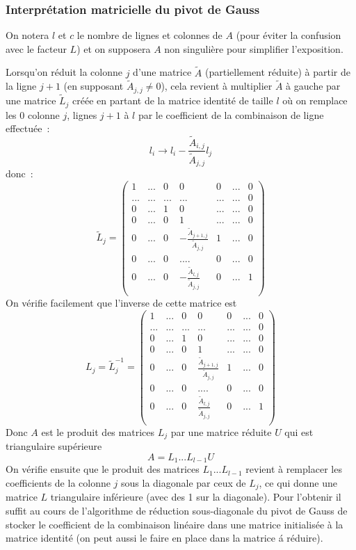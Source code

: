 \documentclass[a4paper,11pt]{article}
\begin{document}
\begin{giacjshere}
\subsubsection{Interpr\'etation matricielle du pivot de Gauss}
On notera $l$ et $c$ le nombre de lignes et colonnes de $A$ (pour
\'eviter la confusion avec le facteur $L$) et on
supposera $A$ non singuli\`ere pour simplifier l'exposition.

 Lorsqu'on r\'eduit la colonne $j$ d'une matrice $\tilde{A}$
 (partiellement r\'eduite) \`a partir
de la ligne $j+1$ (en supposant $\tilde{A}_{j,j} \neq 0$), cela revient \`a
multiplier $\tilde{A}$ \`a gauche par une matrice $\tilde{L}_j$ cr\'e\'ee en
partant de la matrice
identit\'e de taille $l$ o\`u on remplace les 0 
colonne $j$, lignes $j+1$ \`a $l$ par 
le coefficient de la combinaison de ligne effectu\'ee~:
$$l_i \rightarrow l_i - \frac{\tilde{A}_{i,j}}{\tilde{A}_{j,j}} l_j $$
donc~:
\[ \tilde{L}_j = \left( \begin{array}{ccccccc}
1 & ... & 0   & 0 & 0 & ... & 0\\
...& ... & ... & ... & ... & ... & 0\\
0 & ... & 1   & 0 & ... & ... & 0\\
0 & ... & 0 & 1  & ... & ... & 0 \\
0 & ... & 0 & - \frac{\tilde{A}_{j+1,j}}{\tilde{A}_{j,j}} & 1 & ... & 0 \\
 0 & ... & 0  & .... & 0 & ... & 0 \\
0 & ... & 0 & - \frac{\tilde{A}_{l,j}}{\tilde{A}_{j,j}} & 0 & ... & 1\\
\end{array} \right) \]
On v\'erifie facilement que l'inverse de cette matrice est
\[ L_j = \tilde{L}_j^{-1} = \left( \begin{array}{ccccccc}
1 & ... & 0   & 0 & 0 & ... & 0\\
...& ... & ... & ... & ... & ... & 0\\
0 & ... & 1   & 0 & ... & ... & 0\\
0 & ... & 0 & 1  & ... & ... & 0 \\
0 & ... & 0 & \frac{\tilde{A}_{j+1,j}}{\tilde{A}_{j,j}} & 1 & ... & 0 \\
 0 & ... & 0  & .... & 0 & ... & 0 \\
0 & ... & 0 & \frac{\tilde{A}_{l,j}}{\tilde{A}_{j,j}} & 0 & ... & 1\\
\end{array} \right) \]
Donc $A$ est le produit des matrices $L_j$ par une matrice r\'eduite
$U$ qui est triangulaire sup\'erieure
\[ A= L_1...L_{l-1} U \]
On v\'erifie ensuite que le produit des matrices $L_1...L_{l-1}$ revient \`a
remplacer les coefficients de la colonne $j$ sous la diagonale 
par ceux de $L_j$, ce qui donne une matrice $L$ triangulaire
inf\'erieure (avec des 1 sur la diagonale). Pour l'obtenir il suffit
au cours de l'algorithme de r\'eduction sous-diagonale du 
pivot de Gauss de stocker le coefficient
de la combinaison lin\'eaire dans une matrice initialis\'ee
\`a la matrice identit\'e (on peut aussi le faire
en place dans la matrice \'a r\'eduire).


\end{giacjshere}
\end{document}
